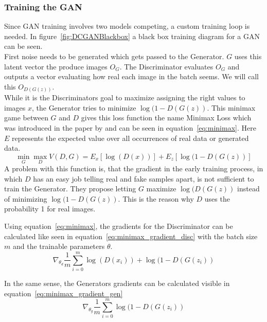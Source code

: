 \documentclass{article}
\begin{document}
\subsubsection{Training the GAN}
\label{ref:GAN_training}
Since GAN training involves two models competing, a custom training loop is needed. In figure~\ref{fig:DCGANBlackbox} a black box training diagram for a GAN can be seen.\\
First noise needs to be generated which gets passed to the Generator. $G$ uses this latent vector the produce images $O_G$. The Discriminator evaluates $O_G$ and outputs a vector evaluating how real each image in the batch seems. We will call this $O_{D(G(z))}$.\\

While it is the Discriminators goal to maximize assigning the right values to images $x$, the Generator tries to minimize $\log(1-D(G(z))$. This minimax game between $G$ and $D$ gives this loss function the name Minimax Loss which was introduced in the paper by \citeauthor{goodfellow_generative_2014} \autocite*{goodfellow_generative_2014} and can be seen in equation~\ref{eq:minimax}. Here $E$ represents the expected value over all occurrences of real data or generated data. 
\begin{equation}
    \min\limits_G \max\limits_D V(D,G) =  E_{x}[\log(D(x))] + E_{z}[\log(1-D(G(z))]
    \label{eq:minimax}
\end{equation}
A problem with this function is, that the gradient in the early training process, in which $D$ has an easy job telling real and fake samples apart, is not sufficient to train the Generator. They propose letting $G$ maximize $\log(D(G(z))$ instead of minimizing $\log(1-D(G(z))$. This is the reason why $D$ uses the probability 1 for real images. 

Using equation~\ref{eq:minimax}, the gradients for the Discriminator can be calculated like seen in equation~\ref{eq:minimax_gradient_disc} with the batch size $m$ and the trainable parameters $\theta$.
\begin{equation}
    \label{eq:minimax_gradient_disc}
    \nabla_{\theta_d} \frac{1}{m} \sum^m_{i=0} \log(D(x_i)) + \log(1-D(G(z_i))
\end{equation}

In the same sense, the Generators gradients can be calculated visible in equation~\ref{eq:minimax_gradient_gen}
\begin{equation}
    \label{eq:minimax_gradient_gen}
    \nabla_{\theta_g} \frac{1}{m} \sum^m_{i=0} \log(1-D(G(z_i))
\end{equation}
\end{document}
